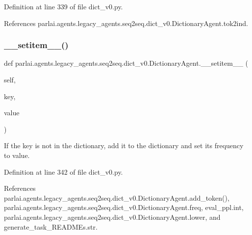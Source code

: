 Definition at line 339 of file dict\+\_\+v0.\+py.



References parlai.\+agents.\+legacy\+\_\+agents.\+seq2seq.\+dict\+\_\+v0.\+Dictionary\+Agent.\+tok2ind.

\mbox{\label{classparlai_1_1agents_1_1legacy__agents_1_1seq2seq_1_1dict__v0_1_1DictionaryAgent_af234fbce75cd277f03b20688f7ba0e52}} 
\subsubsection{\texorpdfstring{\+\_\+\+\_\+setitem\+\_\+\+\_\+()}{\_\_setitem\_\_()}}
{\footnotesize\ttfamily def parlai.\+agents.\+legacy\+\_\+agents.\+seq2seq.\+dict\+\_\+v0.\+Dictionary\+Agent.\+\_\+\+\_\+setitem\+\_\+\+\_\+ (\begin{DoxyParamCaption}\item[{}]{self,  }\item[{}]{key,  }\item[{}]{value }\end{DoxyParamCaption})}

\begin{DoxyVerb}If the key is not in the dictionary, add it to the dictionary and set
its frequency to value.
\end{DoxyVerb}
 

Definition at line 342 of file dict\+\_\+v0.\+py.



References parlai.\+agents.\+legacy\+\_\+agents.\+seq2seq.\+dict\+\_\+v0.\+Dictionary\+Agent.\+add\+\_\+token(), parlai.\+agents.\+legacy\+\_\+agents.\+seq2seq.\+dict\+\_\+v0.\+Dictionary\+Agent.\+freq, eval\+\_\+ppl.\+int, parlai.\+agents.\+legacy\+\_\+agents.\+seq2seq.\+dict\+\_\+v0.\+Dictionary\+Agent.\+lower, and generate\+\_\+task\+\_\+\+R\+E\+A\+D\+M\+Es.\+str.

